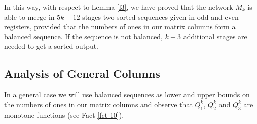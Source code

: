 \documentclass{llncs}
\begin{document}
In this way, with respect to Lemma \ref{l3}, we have proved that the network 
$M_k$ is able to merge in $5k-12$ stages two sorted sequences given in odd 
and even registers, provided that the numbers of ones in our matrix columns 
form a balanced sequence. If the sequence is not balanced, $k-3$ additional 
stages are needed to get a sorted output.

\subsection{Analysis of General Columns}

In a general case we will use balanced sequences as lower and upper bounds on
the numbers of ones in our matrix columns and observe that $Q^k_1$, $Q^k_2$
and $Q^k_3$ are monotone functions (see Fact \ref{fct-10}).
\end{document}
